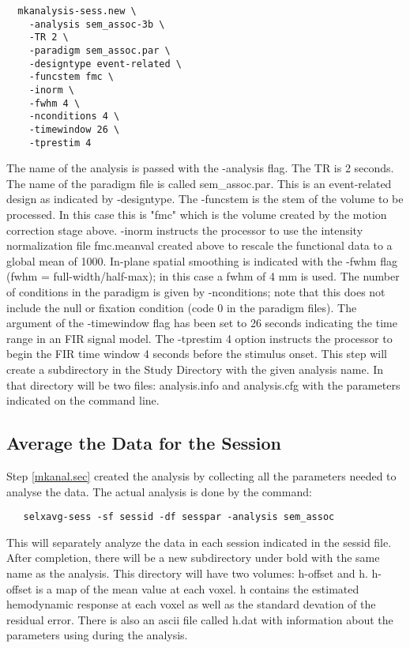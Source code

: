 \documentclass[12pt]{article}
\begin{document}
\begin{verbatim}
  mkanalysis-sess.new \
    -analysis sem_assoc-3b \
    -TR 2 \
    -paradigm sem_assoc.par \
    -designtype event-related \
    -funcstem fmc \
    -inorm \
    -fwhm 4 \
    -nconditions 4 \
    -timewindow 26 \
    -tprestim 4
\end{verbatim}

The name of the analysis is passed with the -analysis flag. The TR is
2 seconds. The name of the paradigm file is called sem\_assoc.par. This
is an event-related design as indicated by -designtype. The -funcstem
is the stem of the volume to be processed. In this case this is "fmc"
which is the volume created by the motion correction stage
above. -inorm instructs the processor to use the intensity
normalization file fmc.meanval created above to rescale the functional
data to a global mean of 1000. In-plane spatial smoothing is indicated
with the -fwhm flag (fwhm = full-width/half-max); in this case a fwhm
of 4 mm is used.  The number of conditions in the paradigm is given by
-nconditions; note that this does not include the null or fixation
condition (code 0 in the paradigm files).  The argument of the
-timewindow flag  has been set to 26 seconds indicating the time range
in an FIR signal model. The -tprestim 4 option instructs the processor
to begin the FIR time window 4 seconds before the stimulus onset. This
step will create a subdirectory in the Study Directory with the given
analysis name. In that directory will be two files: analysis.info and
analysis.cfg with the parameters indicated on the command line.

\subsection{Average the Data for the Session} 

Step \ref{mkanal.sec} created the analysis by collecting all the
parameters needed to analyse the data. The actual analysis is done by
the command:

\begin{verbatim}
   selxavg-sess -sf sessid -df sesspar -analysis sem_assoc
\end{verbatim}

This will separately analyze the data in each session indicated in the
sessid file. After completion, there will be a new subdirectory under
bold with the same name as the analysis. This directory will have two
volumes: h-offset and h. h-offset is a map of the mean value at each
voxel. h contains the estimated hemodynamic response at each voxel as
well as the standard devation of the residual error. There is also an
ascii file called h.dat with information about the parameters using
during the analysis.
\end{document}
